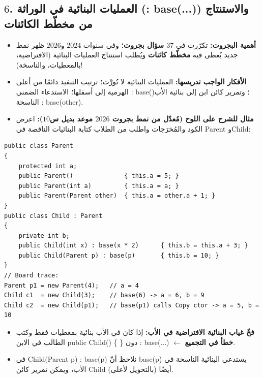 \documentclass[14pt]{extarticle}
\begin{document}
\subsection*{$6$. العمليات البنائية في الوراثة (\textenglish{: base(...)}) والاستنتاج من مخطّط الكائنات}
\begin{itemize}[itemsep=0.25em]
    \item \textbf{أهمية البجروت:} تكرّرت في \textbf{$37$ سؤال بجروت}؛ وفي سنوات $2024$ و$2026$ ظهر نمط جديد يُعطى فيه \textbf{مخطّط كائنات} ويُطلب استنتاج العمليات البنائية (الافتراضية، بالمعطيات، والناسخة)!
    \item \textbf{الأفكار الواجب تدريسها:} العمليات البنائية لا تُورَّث؛ ترتيب التنفيذ دائمًا من أعلى الهرمية إلى أسفلها؛ الاستدعاء الضمني \textenglish{: base()}؛ وتمرير كائن ابن إلى بنائية الأب الناسخة \textenglish{: base(other)}.
    \item \textbf{مثال للشرح على اللوح (مُعدّل من نمط بجروت $2026$ موعد بديل س$10$):} اعرض الكود والمُخرَجات واطلب من الطلاب كتابة البنائيات الناقصة في \textenglish{Parent} و\textenglish{Child}:
\end{itemize}
\begin{boxCode}
\begin{english}
\begin{verbatim}
public class Parent
{
    protected int a;
    public Parent()              { this.a = 5; }
    public Parent(int a)         { this.a = a; }
    public Parent(Parent other)  { this.a = other.a + 1; }
}
public class Child : Parent
{
    private int b;
    public Child(int x) : base(x * 2)      { this.b = this.a + 3; }
    public Child(Parent p) : base(p)       { this.b = 10; }
}
// Board trace:
Parent p1 = new Parent(4);   // a = 4
Child c1  = new Child(3);    // base(6) -> a = 6, b = 9
Child c2  = new Child(p1);   // base(p1) calls Copy ctor -> a = 5, b = 10
\end{verbatim}
\end{english}
\end{boxCode}
\begin{boxWarning}
\begin{itemize}
    \item \textbf{فخّ غياب البنائية الافتراضية في الأب:} إذا كان في الأب بنائية بمعطيات فقط وكتب الطالب في الابن \textenglish{public Child() \{ \}} دون \textenglish{: base(...)} $\leftarrow$ \textbf{خطأ في التجميع}.
    \item في \textenglish{Child(Parent p) : base(p)} نلاحظ أنّ \textenglish{base(p)} يستدعي البنائية الناسخة في الأب، ويمكن تمرير كائن \textenglish{Child} أيضًا (بالتحويل لأعلى).
\end{itemize}
\end{boxWarning}
\end{document}
